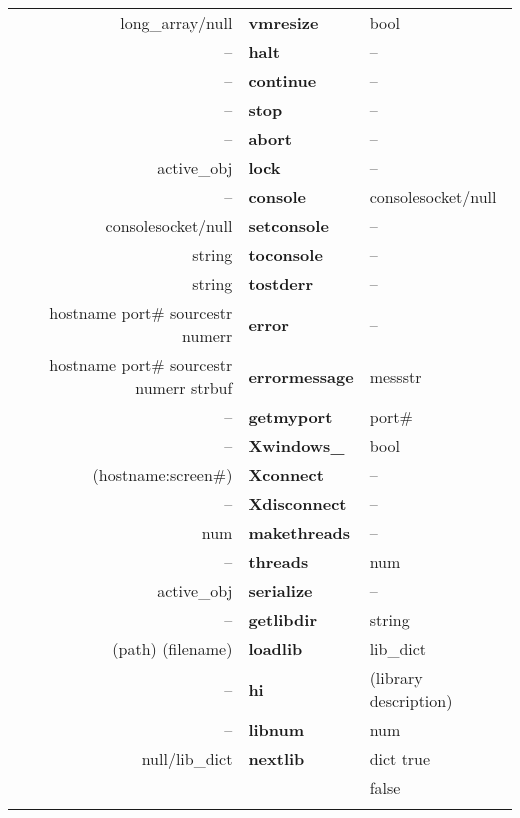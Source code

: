 \begin{tabular}{>{\sffamily}r>{\sffamily\bfseries}l>{\sffamily}l}
long\_array/null  & vmresize & bool\\
-- & halt & --\\
-- & continue & --\\
-- & stop & --\\
-- & abort & --\\
active\_obj & lock & --\\ 
-- & console & consolesocket/null\\
consolesocket/null & setconsole & --\\
string & toconsole & --\\
string & tostderr & --\\
hostname port\# sourcestr numerr & error & --\\
hostname port\# sourcestr numerr strbuf & errormessage & messstr\\
-- & getmyport & port\#\\
-- & Xwindows\_ & bool\\
(hostname:screen\#) & Xconnect & --\\
-- & Xdisconnect & -- \\
num & makethreads & --\\ 
-- & threads & num\\ 
active\_obj & serialize & --\\
-- & getlibdir & string\\
(path) (filename) & loadlib & lib\_dict\\
-- & hi & (library description)\\
-- & libnum & num\\
null/lib\_dict & nextlib & dict true\\
               &         & false\\\\
\end{tabular}



